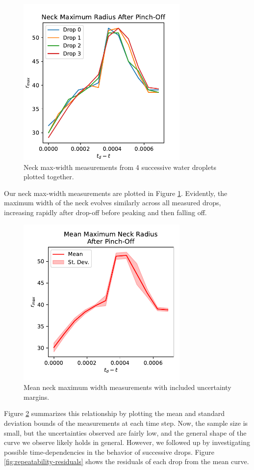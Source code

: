 \documentclass[12pt, letterpaper]{article}
\begin{document}
\begin{figure}[!h]
    \centering
    \includegraphics[width=0.75\textwidth]{experiment3/figures/plots/7all.pdf}
    \caption{Neck max-width measurements from 4 successive water droplets plotted together.}
    \label{fig:repeatability}
\end{figure}

Our neck max-width measurements are plotted in Figure \ref{fig:repeatability}. Evidently, the maximum width of the neck evolves similarly across all measured drops, increasing rapidly after drop-off before peaking and then falling off. 
\begin{figure}[!h]
    \centering
    \includegraphics[width=0.75\textwidth]{experiment3/figures/plots/7mean.pdf}
    \caption{Mean neck maximum width measurements with included uncertainty margins. }
    \label{fig:repeatability-mean}
\end{figure}
Figure \ref{fig:repeatability-mean} summarizes this relationship by plotting the mean and standard deviation bounds of the measurements at each time step. Now, the sample size is small, but the uncertainties observed are fairly low, and the general shape of the curve we observe likely holds in general. However, we followed up by investigating possible time-dependencies in the behavior of successive drops. Figure \ref{fig:repeatability-residuals} shows the residuals of each drop from the mean curve. 
\end{document}
